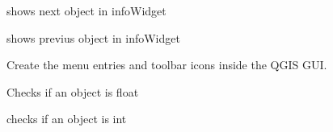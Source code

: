 \documentclass[letterpaper,10pt,english]{sphinxmanual}
\begin{document}
\begin{fulllineitems}

\begin{fulllineitems}
\label{\detokenize{code:Tilgjengelighet.Tilgjengelighet.infoWidget_next}}
shows next object in infoWidget

\end{fulllineitems}


\begin{fulllineitems}
\label{\detokenize{code:Tilgjengelighet.Tilgjengelighet.infoWidget_prev}}
shows previus object in infoWidget

\end{fulllineitems}


\begin{fulllineitems}
\label{\detokenize{code:Tilgjengelighet.Tilgjengelighet.initGui}}
Create the menu entries and toolbar icons inside the QGIS GUI.

\end{fulllineitems}


\begin{fulllineitems}
\label{\detokenize{code:Tilgjengelighet.Tilgjengelighet.is_float}}
Checks if an object is float

\end{fulllineitems}


\begin{fulllineitems}
\label{\detokenize{code:Tilgjengelighet.Tilgjengelighet.is_int}}
checks if an object is int

\end{fulllineitems}



\end{fulllineitems}
\end{document}
